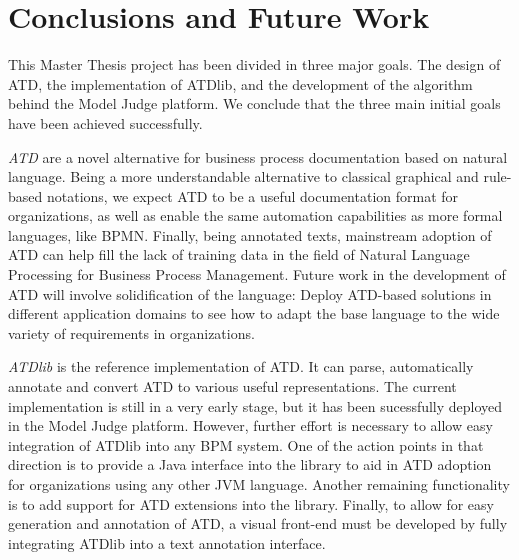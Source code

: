 \chapter{Conclusions and Future Work}
\label{cha:conclusions}

This Master Thesis project has been divided in three major goals. The design of
ATD, the implementation of ATDlib, and the development of the algorithm behind
the Model Judge platform. We conclude that the three main initial goals have
been achieved successfully.



\emph{ATD} are a novel alternative for business process documentation based on natural
language. Being a more understandable alternative to classical graphical and
rule-based notations, we expect ATD to be a useful documentation format for
organizations, as well as enable the same automation capabilities as more formal
languages, like BPMN. Finally, being annotated texts, mainstream adoption of ATD
can help fill the lack of training data in the field of Natural Language
Processing for Business Process Management. Future work in the development of
ATD will involve solidification of the language: Deploy ATD-based solutions in
different application domains to see how to adapt the base language to the wide
variety of requirements in organizations.



\emph{ATDlib} is the reference implementation of ATD. It can parse, automatically
annotate and convert ATD to various useful representations. The current
implementation is still in a very early stage, but it has been sucessfully
deployed in the Model Judge platform. However, further effort is necessary to
allow easy integration of ATDlib into any BPM system. One of the action points
in that direction is to provide a Java interface into the library to aid in ATD
adoption for organizations using any other JVM language. Another remaining
functionality is to add support for ATD extensions into the library. Finally,
to allow for easy generation and annotation of ATD, a visual front-end must be
developed by fully integrating ATDlib into a text annotation interface.

